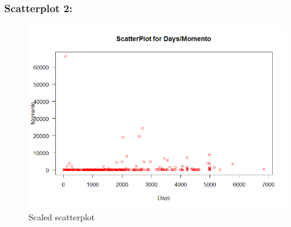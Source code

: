 \documentclass[12pt]{article}
\begin{document}
\subsubsection{Scatterplot 2:}
\begin{figure}[ht]
\includegraphics[scale=0.7]{../Q3/scatterDaysMomento_2}
\centering
\caption{Scaled scatterplot}
\label{scaled-scatterplot}
\end{figure}
\newpage


\cite{*}
\end{document}
